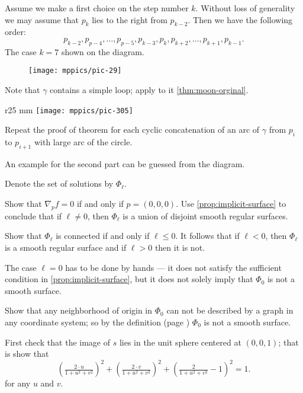 Assume we make a first choice on the step number $k$.
Without loss of generality we may assume that $p_k$ lies to the right from $p_{k-2}$.
Then we have the following order:
\[
p_{k-2},p_{p-4},\dots,p_{p-5},p_{k-3},p_k,p_{k+2},\dots,p_{k+1},p_{k-1}.
\]
The case $k=7$ shown on the diagram.

\begin{figure}[h!]
\vskip-0mm
\centering
\texttt{[image: mppics/pic-29]}
\vskip0mm
\end{figure}

 Note that $\gamma$ contains a simple loop; apply to it \ref{thm:moon-orginal}.

\begin{wrapfigure}{r}{25 mm}
\vskip-0mm
\centering
\texttt{[image: mppics/pic-305]}
\vskip0mm
\end{wrapfigure}

Repeat the proof of theorem for each cyclic concatenation of an arc of $\gamma$ from $p_i$ to $p_{i+1}$ with large arc of the circle. 

An example for the second part can be guessed from the diagram.

Denote the set of solutions by $\Phi_\ell$.

Show that $\nabla_p f=0$ if and only if $p=(0,0,0)$.
Use \ref{prop:implicit-surface} to conclude that if $\ell\ne 0$, then $\Phi_\ell$ is a union of disjoint smooth regular surfaces.

Show that $\Phi_\ell$ is connected if and only if $\ell\le 0$.
It follows that if $\ell<0$, then $\Phi_\ell$ is a smooth regular surface and if $\ell>0$ then it is not.

The case $\ell=0$ has to be done by hands --- it does not satisfy the sufficient condition in \ref{prop:implicit-surface}, but it does not solely imply that $\Phi_0$ is not a smooth surface.

Show that any neighborhood of origin in $\Phi_0$ can not be described by a graph in any coordinate system;
so by the definition (page \pageref{page:def-smooth-surface}) $\Phi_0$ is not a smooth surface.

First check that the image of $s$ lies in the unit sphere centered at $(0,0,1)$;
that is show that 
\[\left(\tfrac{2\cdot u}{1+u^2+v^2}\right)^2
+
\left(\tfrac{2\cdot v}{1+u^2+v^2}\right)^2
+\left(\tfrac{2}{1+u^2+v^2}-1\right)^2=1.\]
for any $u$ and $v$.

